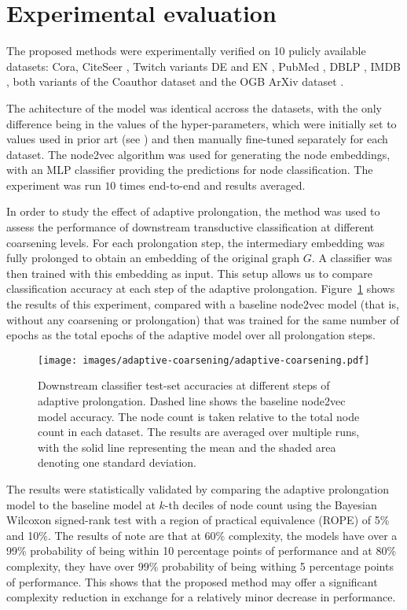 \section{Experimental evaluation}\label{sec:experimental-evaluation}

The proposed methods were experimentally verified on 10 pulicly available datasets: Cora, CiteSeer \cite{yang_revisiting_2016}, Twitch variants DE and EN \cite{rozemberczki_multi-scale_2021}, PubMed \cite{yang_revisiting_2016}, DBLP \cite{bojchevski_deep_2018}, IMDB \cite{fu_magnn_2020}, both variants of the Coauthor dataset \cite{shchur_pitfalls_2019} and the OGB ArXiv dataset \cite{hu_open_2021}.

The achitecture of the model was identical accross the datasets, with the only difference being in the values of the hyper-parameters, which were initially set to values used in prior art (see \cite{hu_open_2021, fey_fast_2019}) and then manually fine-tuned separately for each dataset. The node2vec algorithm was used for generating the node embeddings, with an MLP classifier providing the predictions for node classification. The experiment was run \( 10 \) times end-to-end and results averaged.

In order to study the effect of adaptive prolongation, the method was used to assess the performance of downstream transductive classification at different coarsening levels. For each prolongation step, the intermediary embedding was fully prolonged to obtain an embedding of the original graph \( G \). A classifier was then trained with this embedding as input. This setup allows us to compare classification accuracy at each step of the adaptive prolongation. Figure~\ref{fig:adaptive-coarsening} shows the results of this experiment, compared with a baseline node2vec model (that is, without any coarsening or prolongation) that was trained for the same number of epochs as the total epochs of the adaptive model over all prolongation steps.

\begin{figure}
  \centering
  \texttt{[image: images/adaptive-coarsening/adaptive-coarsening.pdf]}
  \caption{Downstream classifier test-set accuracies at different steps of adaptive prolongation. Dashed line shows the baseline node2vec model accuracy. The node count is taken relative to the total node count in each dataset. The results are averaged over multiple runs, with the solid line representing the mean and the shaded area denoting one standard deviation.}
  \label{fig:adaptive-coarsening}
\end{figure}

The results were statistically validated by comparing the adaptive prolongation model to the baseline model at \( k \)-th deciles of node count using the Bayesian Wilcoxon signed-rank test \cite{benavoli_bayesian_2014} with a region of practical equivalence (ROPE) of 5\% and 10\%. The results of note are that at 60\% complexity, the models have over a 99\% probability of being within 10 percentage points of performance and at 80\% complexity, they have over 99\% probability of being withing 5 percentage points of performance. This shows that the proposed method may offer a significant complexity reduction in exchange for a relatively minor decrease in performance.
